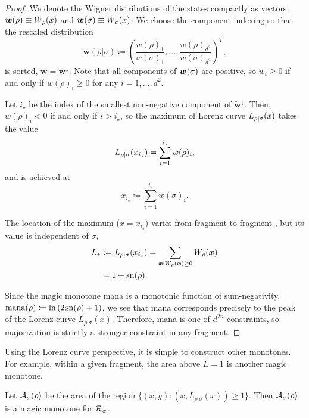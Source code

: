 \documentclass[pra,
aps,
twocolumn,
superscriptaddress,
groupedaddress,
nofootinbib,
reprint
]{revtex4-1}
\begin{document}
\begin{proof}
	We denote the Wigner distributions of the states compactly as vectors $\bm{w}(\rho) \equiv W_\rho(x)$ and $\bm{w}(\sigma) \equiv W_\sigma(x)$.
	We choose the component indexing so that the rescaled distribution 
	\begin{equation}
		\widetilde{\bm{w}}(\rho|\sigma) \coloneqq \left(\frac{w(\rho)_1}{w(\sigma)_1}, \dots, \frac{w(\rho)_{d^2}}{w(\sigma)_{d^2}} \right)^T,
	\end{equation}
	is sorted, $\widetilde{\bm{w}} = \widetilde{\bm{w}}^\downarrow$.
	Note that all components of $\bm{w}(\sigma)$ are positive, so $\widetilde{w}_i \geq 0$ if and only if $w(\rho)_i \geq 0$ for any $i=1,\dots,d^2$.
	
	Let $i_\star$ be the index of the smallest non-negative component of $\widetilde{\bm{w}}^\downarrow$.
	Then, $w(\rho)_i < 0$ if and only if $i > i_\star$, so the maximum of Lorenz curve ${L_{\rho|\sigma}}(x)$ takes the value 
	\begin{equation}
		{L_{\rho|\sigma}}(x_{i_\star}) = \sum_{i=1}^{i_\star} w(\rho)_i,
	\end{equation}
	and is achieved at
	\begin{equation}\label{eq:maxloc}
		x_{i_\star} \coloneqq \sum_{i=1}^{i_\star} w(\sigma)_i.
	\end{equation}

	The location of the maximum ($x=x_{i_\star}$) varies from fragment to fragment , but its value is independent of $\sigma$,
	\begin{align}
	L_\star &:=	\lc{\rho}{\sigma}(x_{i_\star}) 
		= \sum\limits_{\bmx: \W[\bmx]{\rho} \geq 0} \W[\bmx]{\rho} \nonumber \\
		&= 1 + \sn{\rho}.
	\end{align}
	
Since the magic monotone mana is a monotonic function of sum-negativity, $\rm{mana}(\rho) \coloneqq \ln{(2\hspace{1pt} {{\rm{sn}}(\rho)} +1)}$, we see that mana corresponds precisely to the peak of the Lorenz curve $L_{\rho|\sigma}(x)$. Therefore, mana is one of $d^{2n}$ constraints, so majorization is strictly a stronger constraint in any fragment.
\end{proof}
Using the Lorenz curve perspective, it is simple to construct other monotones. For example, within a given fragment, the area above $L=1$ is another magic monotone.
\begin{lemma} Let ${\mathcal A}_\sigma(\rho)$ be the area of the region $\{(x,y) : (x, L_{\rho | \sigma}(x)) \ge 1\}$. Then ${\mathcal A}_\sigma(\rho)$ is a magic monotone for $\mathcal{R}_\sigma$.
\end{lemma}
\end{document}

